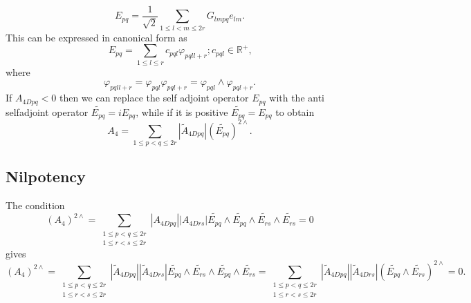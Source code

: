 \documentclass[aps, preprint]{revtex4}
\begin{document}
\begin{equation}E_{p q} =\frac{1}{\sqrt{2}} {\displaystyle\sum _{1 \leq l <m \leq 2 r}}G_{l m p q} e_{l m}\text{.}
\end{equation}This can be expressed in canonical form as
\begin{equation}E_{p q} ={\displaystyle\sum _{1 \leq l \leq r}}c_{p q l} \varphi _{p q l l +r} ;c_{p q l} \in \mathbb{R}^{ +}\text{,}
\end{equation}where
\begin{equation}\varphi _{p q l l +r} =\varphi _{p q l} \varphi _{p q l +r} =\varphi _{p q l} \wedge \varphi _{p q l +r}\text{.}
\end{equation}If $A_{4 D p q} <0$ then we can replace the self adjoint operator $E_{p q}$ with the anti selfadjoint operator $\widetilde{E_{p q}} =i E_{p q}\text{,}$ while if it is positive $\widetilde{E_{p q}} =E_{p q}$ to obtain
\begin{equation}A_{4} ={\displaystyle\sum _{1 \leq p <q \leq 2 r}}\left \vert \widetilde{A}_{4 D p q}\right \vert  \left (\widetilde{E_{p q}}\right )^{2 \wedge }\text{.}
\end{equation}

\subsection{Nilpotency}
The condition
\begin{equation}\left (A_{4}\right )^{2 \wedge } ={\displaystyle\sum _{\begin{array}{c}1 \leq p <q \leq 2 r \\
1 \leq r <s \leq 2 r\end{array}}}\left \vert A_{4 D p q}\right \vert  \left \vert A_{4 D r s}\right \vert  \widetilde{E_{p q}} \wedge \widetilde{E_{p q}} \wedge \widetilde{E_{r s}} \wedge \widetilde{E_{r s}} =0
\end{equation}gives
\begin{equation}\left (A_{4}\right )^{2 \wedge } ={\displaystyle\sum _{\begin{array}{c}1 \leq p <q \leq 2 r \\
1 \leq r <s \leq 2 r\end{array}}}\left \vert \widetilde{A}_{4 D p q}\right \vert  \left \vert \widetilde{A}_{4 D r s}\right \vert  \widetilde{E_{p q}} \wedge \widetilde{E_{r s}} \wedge \widetilde{E_{p q}} \wedge \widetilde{E_{r s}} ={\displaystyle\sum _{\begin{array}{c}1 \leq p <q \leq 2 r \\
1 \leq r <s \leq 2 r\end{array}}}\left \vert \widetilde{A}_{4 D p q}\right \vert  \left \vert \widetilde{A}_{4 D r s}\right \vert  \left (\widetilde{E_{p q}} \wedge \widetilde{E_{r s}}\right )^{2 \wedge } =0.
\end{equation}
\end{document}
